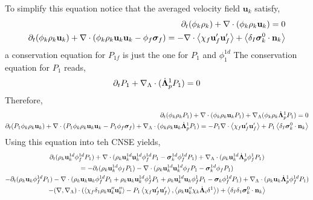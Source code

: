 To simplify this equation notice that the averaged velocity field $\textbf{u}_k$ satisfy, 
\begin{align}
    \partial_t (\phi_k \rho_k)  
    + \mathbf{\nabla}\cdot (
        \phi_k \rho_k\textbf{u}_k
    )
    = 
    0\\
    \partial_t (\phi_k \rho_k\textbf{u}_k)  
    + \mathbf{\nabla}\cdot (
        \phi_k \rho_k\textbf{u}_k\textbf{u}_k
        - \phi_f\bm\sigma_f
    )
    = 
    - \mathbf{\nabla}\cdot\left<\chi_f\textbf{u}_f' \textbf{u}_f'\right>
    + \left<\delta_I \bm{\sigma}_k^0 \cdot \textbf{n}_k\right>
\end{align}
a conservation equation for $P_{1f}$ is just the one for $P_1$ and $\phi_1^{1d}$
The conservation equation for $P_1$ reads, 
\begin{equation}
    \partial_t P_1 +\mathbf{\nabla}_\Lambda\cdot(\dot{\bm\Lambda}_p^1 P_1) = 0 
\end{equation} 
Therefore, 
\begin{align*}
    \partial_t (\phi_k \rho_k P_1 )  
    + \mathbf{\nabla}\cdot (\phi_k \rho_k\textbf{u}_k P_1)
    + \mathbf{\nabla}_\Lambda (\phi_k \rho_k\dot{\bm\Lambda}_p^1 P_1)
    = 
    0\\
    \partial_t (P_1 \phi_k \rho_k\textbf{u}_k)  
    + \mathbf{\nabla}\cdot (
        P_1 \phi_k \rho_k\textbf{u}_k\textbf{u}_k
        - P_1 \phi_f\bm\sigma_f
    )
    + \mathbf{\nabla}_\Lambda\cdot(\phi_k \rho_k \textbf{u}_k \dot{\bm\Lambda}_p^1 P_1)
    = 
    - P_1 \mathbf{\nabla}\cdot\left<\chi_f\textbf{u}_f' \textbf{u}_f'\right>
    + P_1 \left<\delta_I \bm{\sigma}_k^0 \cdot \textbf{n}_k\right>
\end{align*}
Using this equation into teh CNSE yields, 
\begin{multline}
    \partial_t (\rho_k \textbf{u}_k^{1d}  \phi_f^{1d} P_1)
    + \mathbf{\nabla}\cdot (
     \rho_k \textbf{u}_k^{1d} \textbf{u}_k^{1d}  \phi_f^{1d} P_1
    - \bm\sigma_k^{1d} \phi_f^{1d} P_1
    )
    +  \mathbf{\nabla}_\Lambda \cdot ( \rho_k \textbf{u}_k^{1d} \dot{\bm\Lambda}_p^1  \phi_f^1 P_1 )\\
    = 
    - \partial_t (\rho_k \textbf{u}_k^{1d}  \phi_f P_1)
    - \mathbf{\nabla}\cdot (
    \rho_k \textbf{u}_k^{1d} \textbf{u}_k^{1d}  \phi_f P_1
    - \bm\sigma_k^{1d} \phi_f P_1
    )
    \\
    - \partial_t (\rho_k \textbf{u}_k  \phi_f^{1d} P_1)
    - \mathbf{\nabla}\cdot (
        \rho_k \textbf{u}_k \textbf{u}_k  \phi_f^{1d} P_1
        + \rho_k \textbf{u}_k \textbf{u}_k^{1d}  \phi_f^1 P_1
        + \rho_k \textbf{u}_k^{1d} \textbf{u}_k  \phi_f^1 P_1
        - \bm\sigma_k \phi_f^{1d} P_1
        )
    +  \mathbf{\nabla}_\Lambda \cdot ( \rho_k \textbf{u}_k \dot{\bm\Lambda}_p^1 \phi_f^{1d} P_{1} )\\
    - (\mathbf{\nabla},\mathbf{\nabla}_\Lambda)\cdot(\left<\chi_f \delta_1 \rho_k \textbf{u}''_k\textbf{u}''_k\right> 
    - P_1 \left<\chi_f \textbf{u}_f'\textbf{u}_f'\right>,\left<\rho_k \textbf{u}_k'' \chi_k \dot{\bm\Lambda}_i \delta^1\right>)
    + \left<\delta_I\delta_1
         \bm\sigma_k^0
    \cdot \textbf{n}_k\right>\\ 
\end{multline}
